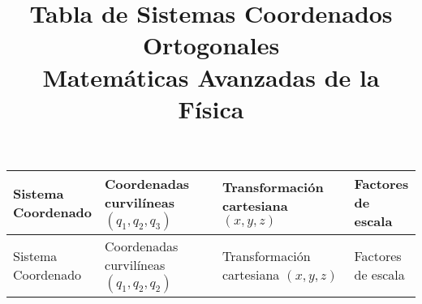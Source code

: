 \documentclass[12pt,landscape]{article}
\title{Tabla de Sistemas Coordenados Ortogonales \\ {\large Matemáticas Avanzadas de la Física}}
\date{ }
\author{}
\numberwithin{equation}{section}
\begin{document}
\renewcommand\labelenumii{\theenumi.{\arabic{enumii}}}
\maketitle
\fontsize{14}{14}\selectfont
\vspace{-2cm}
{\renewcommand{\arraystretch}{4}%
\begin{longtable}{| l | p{5cm} | l | p{7.3cm} |}
\hline

\makecell{Sistema \\ Coordenado} & \makecell{Coordenadas \\ curvilíneas \\ $(q_{1}, q_{2}, q_{3})$} & \makecell{Transformación cartesiana \\ $(x, y,z)$} & \makecell{Factores \\ de escala} \\ \hline
\endfirsthead

\hline
\makecell{Sistema \\ Coordenado} & \makecell{Coordenadas \\ curvilíneas \\ $(q_{1}, q_{2}, q_{2})$} & \makecell{Transformación cartesiana \\ $(x, y,z)$} & \makecell{Factores \\ de escala} \\ \hline
\endhead


\end{longtable}}
\end{document}

